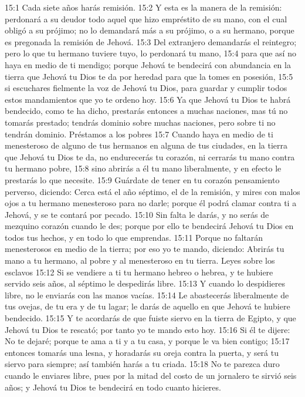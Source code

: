 15:1 Cada siete años harás remisión.  
15:2 Y esta es la manera de la remisión: perdonará a su deudor todo aquel que hizo empréstito de su mano, con el cual obligó a su prójimo; no lo demandará más a su prójimo, o a su hermano, porque es pregonada la remisión de Jehová.  
15:3 Del extranjero demandarás el reintegro; pero lo que tu hermano tuviere tuyo, lo perdonará tu mano,  
15:4 para que así no haya en medio de ti mendigo; porque Jehová te bendecirá con abundancia en la tierra que Jehová tu Dios te da por heredad para que la tomes en posesión,  
15:5 si escuchares fielmente la voz de Jehová tu Dios, para guardar y cumplir todos estos mandamientos que yo te ordeno hoy.  
15:6 Ya que Jehová tu Dios te habrá bendecido, como te ha dicho, prestarás entonces a muchas naciones, mas tú no tomarás prestado; tendrás dominio sobre muchas naciones, pero sobre ti no tendrán dominio. 
Préstamos a los pobres  
15:7 Cuando haya en medio de ti menesteroso de alguno de tus hermanos en alguna de tus ciudades, en la tierra que Jehová tu Dios te da, no endurecerás tu corazón, ni cerrarás tu mano contra tu hermano pobre,  
15:8 sino abrirás a él tu mano liberalmente, y en efecto le prestarás lo que necesite.  
15:9 Guárdate de tener en tu corazón pensamiento perverso, diciendo: Cerca está el año séptimo, el de la remisión, y mires con malos ojos a tu hermano menesteroso para no darle; porque él podrá clamar contra ti a Jehová, y se te contará por pecado.  
15:10 Sin falta le darás, y no serás de mezquino corazón cuando le des; porque por ello te bendecirá Jehová tu Dios en todos tus hechos, y en todo lo que emprendas.  
15:11 Porque no faltarán menesterosos en medio de la tierra; por eso yo te mando, diciendo: Abrirás tu mano a tu hermano, al pobre y al menesteroso en tu tierra.  
Leyes sobre los esclavos   
15:12 Si se vendiere a ti tu hermano hebreo o hebrea, y te hubiere servido seis años, al séptimo le despedirás libre.  
15:13 Y cuando lo despidieres libre, no le enviarás con las manos vacías.  
15:14 Le abastecerás liberalmente de tus ovejas, de tu era y de tu lagar; le darás de aquello en que Jehová te hubiere bendecido.  
15:15 Y te acordarás de que fuiste siervo en la tierra de Egipto, y que Jehová tu Dios te rescató; por tanto yo te mando esto hoy.  
15:16 Si él te dijere: No te dejaré; porque te ama a ti y a tu casa, y porque le va bien contigo;  
15:17 entonces tomarás una lesna, y horadarás su oreja contra la puerta, y será tu siervo para siempre; así también harás a tu criada.  
15:18 No te parezca duro cuando le enviares libre, pues por la mitad del costo de un jornalero te sirvió seis años; y Jehová tu Dios te bendecirá en todo cuanto hicieres. 
